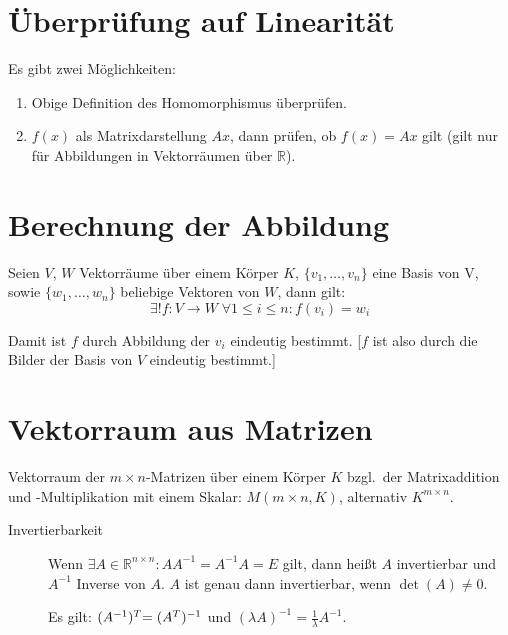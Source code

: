 \section{Überprüfung auf Linearität}

Es gibt zwei Möglichkeiten:
\begin{enumerate}
  \item Obige Definition des Homomorphismus überprüfen.
  \item $f(x)$ als Matrixdarstellung $Ax$, dann prüfen, ob $f(x)=Ax$ gilt (gilt nur für Abbildungen in Vektorräumen über $\mathbb{R}$).
\end{enumerate}

\section{Berechnung der Abbildung}

Seien $V$, $W$ Vektorräume über einem Körper $K$, $\{v_1,\ldots,v_n\}$ eine Basis von V, sowie $\{w_1,\ldots,w_n\}$ beliebige Vektoren von $W$, dann gilt:
\[ \exists! f:V \to W\;\forall1\leq i\leq n:f(v_{i})=w_{i} \]

Damit ist $f$ durch Abbildung der $v_i$ eindeutig bestimmt.
[$f$ ist also durch die Bilder der Basis von $V$ eindeutig bestimmt.]


\section{Vektorraum aus Matrizen}

Vektorraum der $m\times n$-Matrizen über einem Körper $K$ bzgl.~der Matrixaddition und -Multiplikation mit einem Skalar: $M(m\times n,K)$, alternativ $K^{m\times n}$.
\begin{description}
  \item [{Invertierbarkeit}]
	Wenn $\exists A\in\mathbb{R}^{n\times n}:AA^{-1}=A^{-1}A=E$ gilt, dann heißt $A$ invertierbar
	und $A^{-1}$ Inverse von $A$. $A$ ist genau dann invertierbar, wenn $\det(A)\neq0$.

	Es gilt: $(A^{-1})\t = (A^T)^{-1}$ und $(\lambda A)^{-1}=\frac{1}{\lambda}A^{-1}$.
\end{description}
